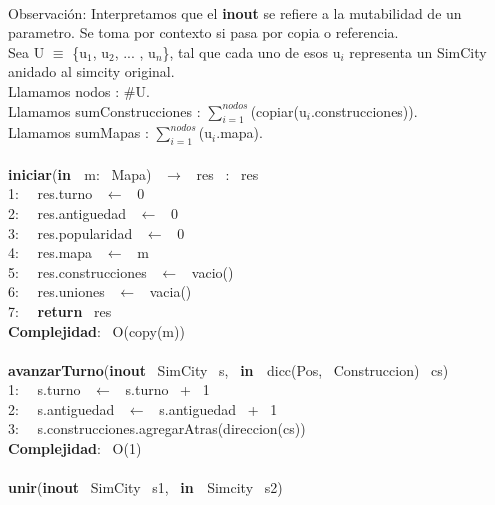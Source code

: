 \begin{Algoritmos} \\
    \noindent Observación: Interpretamos que el \textbf{inout} se refiere a la mutabilidad de un parametro. Se toma por contexto si pasa por copia o referencia.\\
    Sea U $\equiv$ \{u$_1$, u$_2$, ... , u$_n$\}, 
    tal que cada uno de esos u$_i$ representa un SimCity anidado al simcity original.\\
    Llamamos nodos : $ \# $U.\\
    Llamamos sumConstrucciones : $\sum_{i=1}^{nodos}$(copiar(u$_i$.construcciones)).\\
    Llamamos sumMapas : $\sum_{i=1}^{nodos}$(u$_i$.mapa).\\
    \\
    \makebox[\linewidth]{\rule{\textwidth}{0.4pt}}
    \textbf{iniciar}(\textbf{in \ }m: \ Mapa) \ $\longrightarrow$ \ res \ : \ res\\
    1: \  \ res.turno \ $\leftarrow$ \ 0\\
    2: \  \ res.antiguedad \ $\leftarrow$ \ 0\\
    3: \  \ res.popularidad \ $\leftarrow$ \ 0\\
    4: \  \ res.mapa \ $\leftarrow$ \ m\\
    5: \  \ res.construcciones \ $\leftarrow$ \ vacio()\\
    6: \  \ res.uniones \ $\leftarrow$ \ vacia()\\
    7: \  \ \textbf{return} \ res\\
    \textbf{Complejidad}: \ O(copy(m))\\
    \makebox[\linewidth]{\rule{\textwidth}{0.4pt}}
    \\
    \makebox[\linewidth]{\rule{\textwidth}{0.4pt}}
    \textbf{avanzarTurno}(\textbf{inout} \ SimCity \ s, \ \textbf{in \ }dicc(Pos, \ Construccion) \ cs)\\
    1: \  \ s.turno \ $\leftarrow$ \ s.turno \ + \ 1 \ \\
    2: \  \ s.antiguedad \ $\leftarrow$ \ s.antiguedad \ + \ 1 \ \\
    3: \  \ s.construcciones.agregarAtras(direccion(cs))\\
    \textbf{Complejidad}: \ O(1)\\
    \makebox[\linewidth]{\rule{\textwidth}{0.4pt}}
    \\
    \makebox[\linewidth]{\rule{\textwidth}{0.4pt}}
    \textbf{unir}(\textbf{inout} \ SimCity \ s1, \ \textbf{in \ }Simcity \ s2)\\

\end{Algoritmos}
